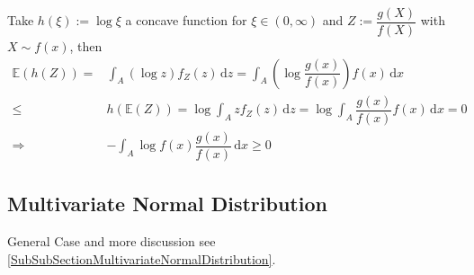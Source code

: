 \begin{itemize}
\begin{itemize}[topsep=2pt,itemsep=0pt]
        Take $ h(\xi ):=\log \xi  $ a concave function for $ \xi \in(0,\infty) $ and $ Z:=\dfrac{g(X)}{f(X)} $ with $ X\sim f(x) $, then
        \begin{align}
            \mathbb{E}\left( h(Z) \right) =&\int _A \left(\log z\right) f_Z(z) \,\mathrm{d}z=\int _A \left(\log \dfrac{g(x)}{f(x)}\right) f(x) \,\mathrm{d}x\\
            \leq &h(\mathbb{E}\left( Z \right) )=\log \int _A zf_Z(z) \,\mathrm{d}z=\log \int _A \dfrac{g(x)}{f(x)}f(x) \,\mathrm{d}x=0\\
            \Rightarrow& -\int _A \log f(x)\dfrac{g(x)}{f(x)} \,\mathrm{d}x\geq 0
        \end{align}
        
        
    \end{itemize}
    
\end{itemize}


\subsection{Multivariate Normal Distribution}\label{SubsectionDerivationMultivariateNormal}
    General Case and more discussion see \autoref{SubSubSectionMultivariateNormalDistribution}.

